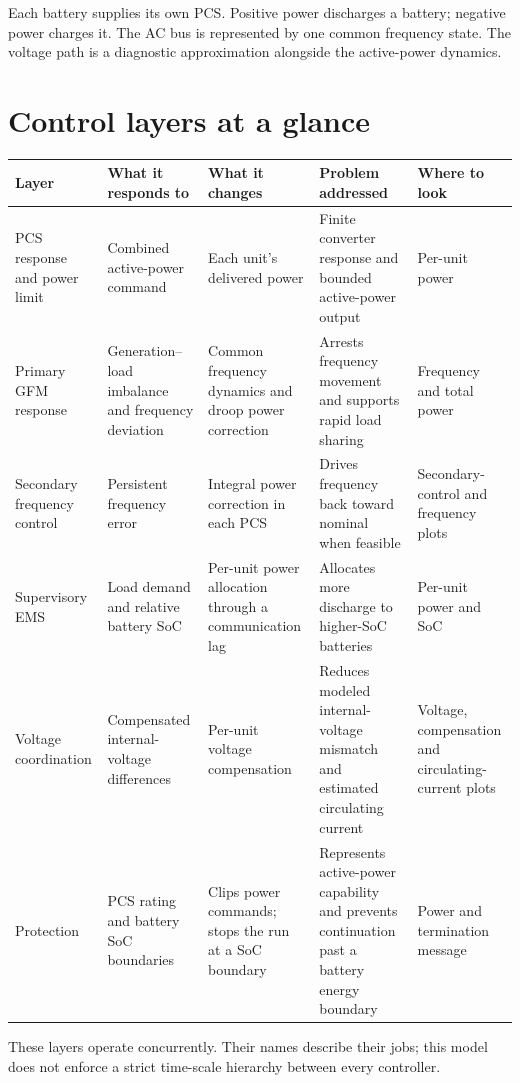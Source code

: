 \documentclass[11pt,a4paper]{article}
\begin{document}
Each battery supplies its own PCS. Positive power discharges a battery; negative power charges it. The AC bus is represented by one common frequency state. The voltage path is a diagnostic approximation alongside the active-power dynamics.

\section{Control layers at a glance}

\begingroup\small
\setlength{\tabcolsep}{3pt}
\begin{longtable}{p{}p{}p{}p{}p{}}
\toprule
Layer & What it responds to & What it changes & Problem addressed & Where to look \\
\midrule\endhead
PCS response and power limit & Combined active-power command & Each unit's delivered power & Finite converter response and bounded active-power output & Per-unit power \\
Primary GFM response & Generation--load imbalance and frequency deviation & Common frequency dynamics and droop power correction & Arrests frequency movement and supports rapid load sharing & Frequency and total power \\
Secondary frequency control & Persistent frequency error & Integral power correction in each PCS & Drives frequency back toward nominal when feasible & Secondary-control and frequency plots \\
Supervisory EMS & Load demand and relative battery SoC & Per-unit power allocation through a communication lag & Allocates more discharge to higher-SoC batteries & Per-unit power and SoC \\
Voltage coordination & Compensated internal-voltage differences & Per-unit voltage compensation & Reduces modeled internal-voltage mismatch and estimated circulating current & Voltage, compensation and circulating-current plots \\
Protection & PCS rating and battery SoC boundaries & Clips power commands; stops the run at a SoC boundary & Represents active-power capability and prevents continuation past a battery energy boundary & Power and termination message \\
\bottomrule
\end{longtable}
\endgroup

These layers operate concurrently. Their names describe their jobs; this model does not enforce a strict time-scale hierarchy between every controller.
\end{document}
